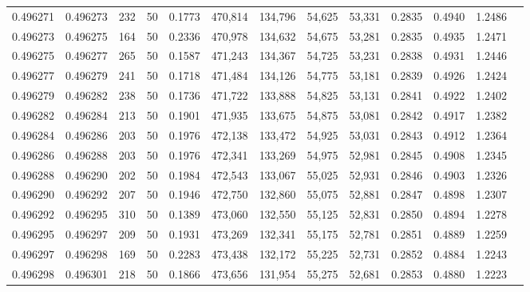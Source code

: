 \begin{tabular}{rrrrrrrrrrrrr}
0.496271 & 0.496273 &   232 &  50 &                                     0.1773 & 470,814 & 134,796 &  54,625 &  53,331 & 0.2835 & 0.4940 & 1.2486 \\
0.496273 & 0.496275 &   164 &  50 &                                     0.2336 & 470,978 & 134,632 &  54,675 &  53,281 & 0.2835 & 0.4935 & 1.2471 \\
0.496275 & 0.496277 &   265 &  50 &                                     0.1587 & 471,243 & 134,367 &  54,725 &  53,231 & 0.2838 & 0.4931 & 1.2446 \\
0.496277 & 0.496279 &   241 &  50 &                                     0.1718 & 471,484 & 134,126 &  54,775 &  53,181 & 0.2839 & 0.4926 & 1.2424 \\
0.496279 & 0.496282 &   238 &  50 &                                     0.1736 & 471,722 & 133,888 &  54,825 &  53,131 & 0.2841 & 0.4922 & 1.2402 \\
0.496282 & 0.496284 &   213 &  50 &                                     0.1901 & 471,935 & 133,675 &  54,875 &  53,081 & 0.2842 & 0.4917 & 1.2382 \\
0.496284 & 0.496286 &   203 &  50 &                                     0.1976 & 472,138 & 133,472 &  54,925 &  53,031 & 0.2843 & 0.4912 & 1.2364 \\
0.496286 & 0.496288 &   203 &  50 &                                     0.1976 & 472,341 & 133,269 &  54,975 &  52,981 & 0.2845 & 0.4908 & 1.2345 \\
0.496288 & 0.496290 &   202 &  50 &                                     0.1984 & 472,543 & 133,067 &  55,025 &  52,931 & 0.2846 & 0.4903 & 1.2326 \\
0.496290 & 0.496292 &   207 &  50 &                                     0.1946 & 472,750 & 132,860 &  55,075 &  52,881 & 0.2847 & 0.4898 & 1.2307 \\
0.496292 & 0.496295 &   310 &  50 &                                     0.1389 & 473,060 & 132,550 &  55,125 &  52,831 & 0.2850 & 0.4894 & 1.2278 \\
0.496295 & 0.496297 &   209 &  50 &                                     0.1931 & 473,269 & 132,341 &  55,175 &  52,781 & 0.2851 & 0.4889 & 1.2259 \\
0.496297 & 0.496298 &   169 &  50 &                                     0.2283 & 473,438 & 132,172 &  55,225 &  52,731 & 0.2852 & 0.4884 & 1.2243 \\
0.496298 & 0.496301 &   218 &  50 &                                     0.1866 & 473,656 & 131,954 &  55,275 &  52,681 & 0.2853 & 0.4880 & 1.2223 \\

\end{tabular}
